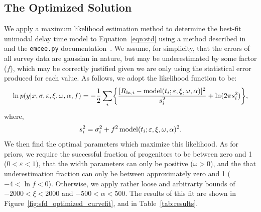 \documentclass[apj]{aastex62}
\begin{document}
\subsection{The Optimized Solution\label{sec:optimized_soln}}
We apply a maximum likelihood estimation method to determine the best-fit unimodal delay time model to Equation~\ref{eqn:std} using a method described in \cite{Hogg:2010fj} and the {\tt emcee.py} documentation~\citep{Foreman-Mackey:2013pd}. We assume, for simplicity, that the errors of all survey data are gaussian in nature, but may be underestimated by some factor ($f$), which may be correctly justified given we are only using the statistical error produced for each value.  As follows, we adopt the likelihood function to be:
\begin{equation}
\ln p(y|x, \sigma, \varepsilon, \xi, \omega, \alpha, f) = -\frac{1}{2} \sum_i \biggl\{ \frac{[R_{{\rm Ia},i} - {\rm model}(t_i; \varepsilon, \xi, \omega, \alpha)]^2}{s_i^2}+\ln (2\pi s_i^2)\biggr\},
	\label{eqn:lf}
\end{equation}
where,
\begin{equation}
s_i^2 = \sigma_i^2+f^2\, {\rm model}(t_i; \varepsilon, \xi, \omega, \alpha)^2.
\end{equation}
\noindent We then find the optimal parameters which maximize this likelihood. As for priors, we require the successful fraction of progenitors to be between zero and 1 ($0<\varepsilon<1$), that the width parameters can only be positive ($\omega>0$), and the that underestimation fraction can only be between approximately zero and 1 ($-4<\ln f<0$). Otherwise, we apply rather loose and arbitrarty bounds of $-2000<\xi<2000$ and  $-500 < \alpha < 500$. The results of this fit are shown in Figure~\ref{fig:sfd_optimized_curvefit}, and in Table~\ref{tab:results}. 
\end{document}
